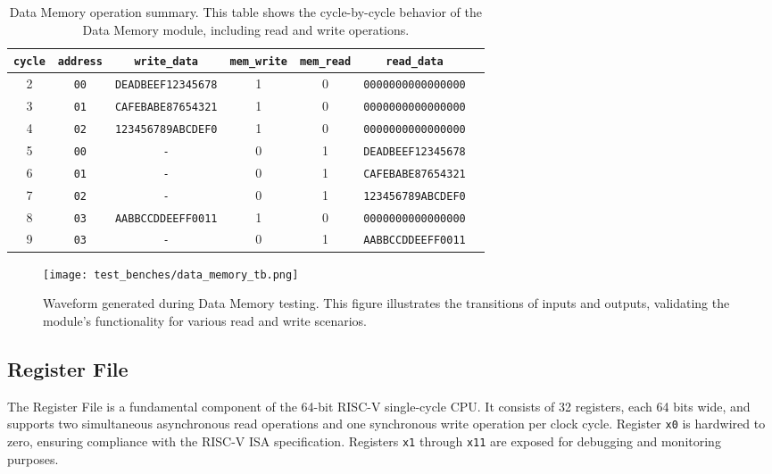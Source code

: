 \documentclass[12pt]{article}
\begin{document}
\begin{table}[ht!]
    \centering
    \renewcommand{\arraystretch}{1.1}
    \setlength{\tabcolsep}{6pt}
    \begin{tabular}{|c|c|c|c|c|c|c|}
        \hline
        \textbf{\texttt{cycle}} & \textbf{\texttt{address}} & \textbf{\texttt{write\_data}} & \textbf{\texttt{mem\_write}} & \textbf{\texttt{mem\_read}} & \textbf{\texttt{read\_data}} \\
        \hline
        2 & \texttt{00} & \texttt{DEADBEEF12345678} & 1 & 0 & \texttt{0000000000000000} \\
        3 & \texttt{01} & \texttt{CAFEBABE87654321} & 1 & 0 & \texttt{0000000000000000} \\
        4 & \texttt{02} & \texttt{123456789ABCDEF0} & 1 & 0 & \texttt{0000000000000000} \\
        5 & \texttt{00} & \texttt{-} & 0 & 1 & \texttt{DEADBEEF12345678} \\
        6 & \texttt{01} & \texttt{-} & 0 & 1 & \texttt{CAFEBABE87654321} \\
        7 & \texttt{02} & \texttt{-} & 0 & 1 & \texttt{123456789ABCDEF0} \\
        8 & \texttt{03} & \texttt{AABBCCDDEEFF0011} & 1 & 0 & \texttt{0000000000000000} \\
        9 & \texttt{03} & \texttt{-} & 0 & 1 & \texttt{AABBCCDDEEFF0011} \\
        \hline
    \end{tabular}
    \caption{Data Memory operation summary. This table shows the cycle-by-cycle behavior of the Data Memory module, including read and write operations.}
    \label{tab:data_memory_results}
\end{table}

\begin{figure}[ht!]
    \centering
    \texttt{[image: test\_benches/data\_memory\_tb.png]}
    \caption{Waveform generated during Data Memory testing. This figure illustrates the transitions of inputs and outputs, validating the module's functionality for various read and write scenarios.}
    \label{fig:data_memory_waveform}
\end{figure}

\subsection*{Register File}

The Register File is a fundamental component of the 64-bit RISC-V single-cycle CPU. It consists of 32 registers, each 64 bits wide, and supports two simultaneous asynchronous read operations and one synchronous write operation per clock cycle. Register \texttt{x0} is hardwired to zero, ensuring compliance with the RISC-V ISA specification. Registers \texttt{x1} through \texttt{x11} are exposed for debugging and monitoring purposes.
\end{document}
